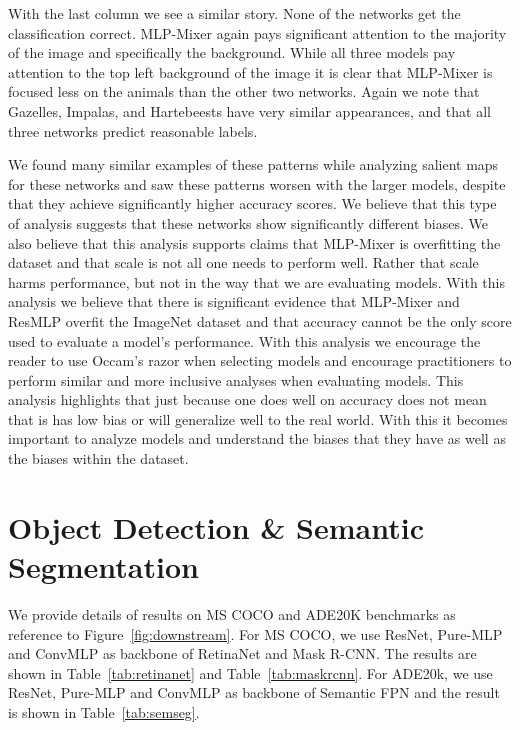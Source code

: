 \documentclass[final]{cvpr}
\begin{document}
With the last column we see a similar story. 
None of the networks get the classification correct.
MLP-Mixer again pays significant attention to the majority of the image and specifically the background. 
While all three models pay attention to the top left background of the image it is clear that MLP-Mixer is focused less on the animals than the other two networks.
Again we note that Gazelles, Impalas, and Hartebeests have very similar appearances, and that all three networks predict reasonable labels.

We found many similar examples of these patterns while analyzing salient maps for these networks and saw these patterns worsen with the larger models, despite that they achieve significantly higher accuracy scores. 
We believe that this type of analysis suggests that these networks show significantly different biases.
We also believe that this analysis supports claims that MLP-Mixer is overfitting the dataset and that scale is not all one needs to perform well. 
Rather that scale harms performance, but not in the way that we are evaluating models.
With this analysis we believe that there is significant evidence that MLP-Mixer and ResMLP overfit the ImageNet dataset and that accuracy cannot be the only score used to evaluate a model's performance. 
With this analysis we encourage the reader to use Occam's razor when selecting models and encourage practitioners to perform similar and more inclusive analyses when evaluating models. 
This analysis highlights that just because one does well on accuracy does not mean that is has low bias or will generalize well to the real world. 
With this it becomes important to analyze models and understand the biases that they have as well as the biases within the dataset. 

\section{Object Detection \& Semantic Segmentation}
We provide details of results on MS COCO and ADE20K benchmarks as reference to Figure~\ref{fig:downstream}. For MS COCO, we use ResNet, Pure-MLP and ConvMLP as backbone of RetinaNet and Mask R-CNN. The results are shown in Table~\ref{tab:retinanet} and Table~\ref{tab:maskrcnn}. For ADE20k, we use ResNet, Pure-MLP and ConvMLP as backbone of Semantic FPN and the result is shown in Table~\ref{tab:semseg}.
\end{document}
